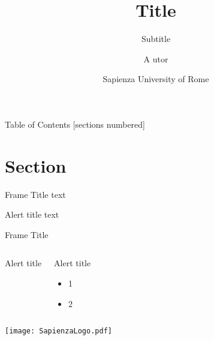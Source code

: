 \documentclass[11pt,aspectratio=43]{beamer}
\title[Title]{Title}
\subtitle{\textcolor{courage}{Subtitle}}
\author[A.utor]{\textcolor{charcoal}{A utor}}
\date[uniroma1]{\textcolor{charcoal}{Sapienza University of Rome}}
\institute{\hspace{60mm}
\texttt{[image: SapienzaLogo.pdf]}
\hspace{10mm}
\texttt{[image: logo\_ispamm.pdf]}
}
\begin{document}
	
	\maketitle
    
	\begin{frame}{Table of Contents}
		[sections numbered]
		\tableofcontents[hideallsubsections]
	\end{frame}
    
	\section{Section}
    
	\begin{frame}{Frame Title}
	    text
		\begin{alertblock}{Alert title}
    		text
		\end{alertblock}
	\end{frame}
    
	\begin{frame}{Frame Title}
	
		\begin{columns}[T]
	        \begin{exampleblock}{Alert title}
		    \end{exampleblock}
			
			\begin{alertblock}{Alert title}
				\begin{itemize}
					\item<+->1
					\item<+-> 2
				\end{itemize}
			\end{alertblock}
		\end{columns}
	\end{frame}

	\appendix
	

	\begin{frame}[standout]
	    \vspace{10mm}
		\texttt{[image: SapienzaLogo.pdf]}
	\end{frame}
\end{document}
